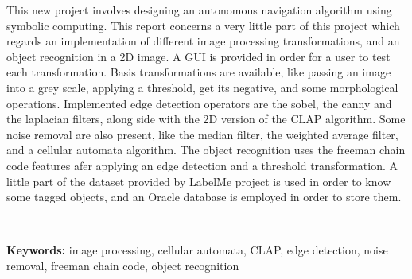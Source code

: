 \large{ 
This new project involves designing an autonomous navigation algorithm using symbolic computing. This report concerns a very little part of this project which regards an implementation of different image processing transformations, and an object recognition in a 2D image. A GUI is provided in order for a user to test each transformation. Basis transformations are available, like passing an image into a grey scale, applying a threshold, get its negative, and some morphological operations. Implemented edge detection operators are the sobel, the canny and the laplacian filters, along side with the 2D version of the CLAP algorithm. Some noise removal are also present, like the median filter, the weighted average filter, and a cellular automata algorithm. The object recognition uses the freeman chain code features afer applying an edge detection and a threshold transformation. A little part of the dataset provided by LabelMe project is used in order to know some tagged objects, and an Oracle database is employed in order to store them.
}

~~

\textbf{Keywords: } image processing, cellular automata, CLAP, edge detection, noise removal, freeman chain code, object recognition

\vfill
